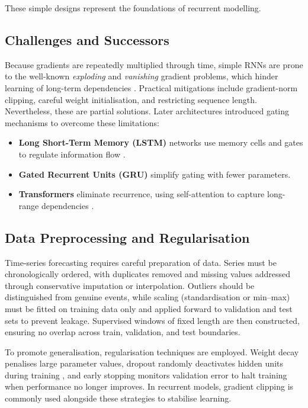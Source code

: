 \documentclass[conference]{IEEEtran}
\begin{document}
These simple designs represent the foundations of recurrent modelling.

\subsection{\textbf{Challenges and Successors}}
Because gradients are repeatedly multiplied through time, simple RNNs are prone to the well-known \textit{exploding} and \textit{vanishing} gradient problems, which hinder learning of long-term dependencies \cite{pascanu2013difficulty}. Practical mitigations include gradient-norm clipping, careful weight initialisation, and restricting sequence length. Nevertheless, these are partial solutions. Later architectures introduced gating mechanisms to overcome these limitations:  

\begin{itemize}
\item \textbf{Long Short-Term Memory (LSTM)} networks use memory cells and gates to regulate information flow \cite{hochreiter1997lstm}.  
\item \textbf{Gated Recurrent Units (GRU)} simplify gating with fewer parameters.  
\item \textbf{Transformers} eliminate recurrence, using self-attention to capture long-range dependencies \cite{vaswani2017attention}.  
\end{itemize}

\subsection{\textbf{Data Preprocessing and Regularisation}}
Time-series forecasting requires careful preparation of data. Series must be chronologically ordered, with duplicates removed and missing values addressed through conservative imputation or interpolation. Outliers should be distinguished from genuine events, while scaling (standardisation or min--max) must be fitted on training data only and applied forward to validation and test sets to prevent leakage. Supervised windows of fixed length are then constructed, ensuring no overlap across train, validation, and test boundaries.

To promote generalisation, regularisation techniques are employed. Weight decay penalises large parameter values, dropout randomly deactivates hidden units during training \cite{goodfellow2016deep}, and early stopping monitors validation error to halt training when performance no longer improves. In recurrent models, gradient clipping is commonly used alongside these strategies to stabilise learning.
\end{document}
